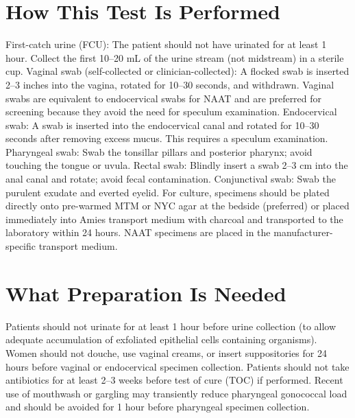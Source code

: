 \section*{How This Test Is Performed}
First-catch urine (FCU): The patient should not have urinated for at least 1 hour. Collect the first 10--20 mL of the urine stream (not midstream) in a sterile cup. Vaginal swab (self-collected or clinician-collected): A flocked swab is inserted 2--3 inches into the vagina, rotated for 10--30 seconds, and withdrawn. Vaginal swabs are equivalent to endocervical swabs for NAAT and are preferred for screening because they avoid the need for speculum examination. Endocervical swab: A swab is inserted into the endocervical canal and rotated for 10--30 seconds after removing excess mucus. This requires a speculum examination. Pharyngeal swab: Swab the tonsillar pillars and posterior pharynx; avoid touching the tongue or uvula. Rectal swab: Blindly insert a swab 2--3 cm into the anal canal and rotate; avoid fecal contamination. Conjunctival swab: Swab the purulent exudate and everted eyelid. For culture, specimens should be plated directly onto pre-warmed MTM or NYC agar at the bedside (preferred) or placed immediately into Amies transport medium with charcoal and transported to the laboratory within 24 hours. NAAT specimens are placed in the manufacturer-specific transport medium.

\section*{What Preparation Is Needed}
Patients should not urinate for at least 1 hour before urine collection (to allow adequate accumulation of exfoliated epithelial cells containing organisms). Women should not douche, use vaginal creams, or insert suppositories for 24 hours before vaginal or endocervical specimen collection. Patients should not take antibiotics for at least 2--3 weeks before test of cure (TOC) if performed. Recent use of mouthwash or gargling may transiently reduce pharyngeal gonococcal load and should be avoided for 1 hour before pharyngeal specimen collection.

